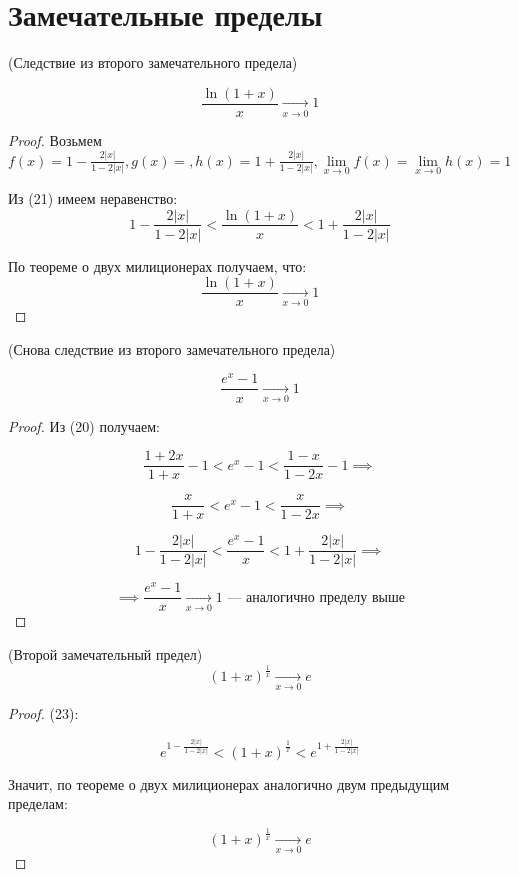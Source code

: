 \section{Замечательные пределы}

\begin{theorem} (Следствие из второго замечательного предела)
    
    $$\frac{\ln(1+x)}{x} \underset{x \to 0}{\to} 1$$
\end{theorem}


\begin{proof}
    Возьмем $f(x) = 1 - \frac{2|x|}{1-2|x|}, g(x) = , h(x) = 1 + \frac{2|x|}{1-2|x|}, \lim\limits_{x \to 0} f(x) = \lim\limits_{x \to 0} h(x) = 1$

    Из (21) имеем неравенство: $$1 -\frac{2|x|}{1-2|x|} < \frac{\ln(1+x)}{x}<1 + \frac{2|x|}{1-2|x|}$$

    По теореме о двух милиционерах получаем, что:$$\frac{\ln(1+x)}{x} \underset{x \to 0}{\to} 1$$    
\end{proof}

\begin{theorem} (Снова следствие из второго замечательного предела)
    
    $$\frac{e^x - 1}{x} \underset{x \to 0}{\to} 1$$
\end{theorem}


\begin{proof}
    
    Из (20) получаем:

    \[\frac{1+2x}{1+x} - 1 < e^x - 1< \frac{1-x}{1-2x} - 1 \implies\]

    \[\frac{x}{1+x} < e^x - 1< \frac{x}{1-2x} \implies\]

    \[1 - \frac{2|x|}{1-2|x|} < \frac{e^x - 1}{x}< 1 + \frac{2|x|}{1-2|x|} \implies\]

    \[\implies \frac{e^x - 1}{x} \underset{x \to 0}{\to} 1 \text{ --- аналогично пределу выше}\]
\end{proof}

\begin{theorem} (Второй замечательный предел)
    \[(1+x)^{\frac{1}{x}} \underset{x \to 0}{\to} e\]
\end{theorem}

\begin{proof}
    
    (23):

    \[e^{1-\frac{2|x|}{1-2|x|}} < (1+x)^{\frac{1}{x}} < e^{1+\frac{2|x|}{1-2|x|}}\]

    Значит, по теореме о двух милиционерах аналогично двум предыдущим пределам:

    \[(1+x)^{\frac{1}{x}} \underset{x \to 0}{\to} e\]
\end{proof}

